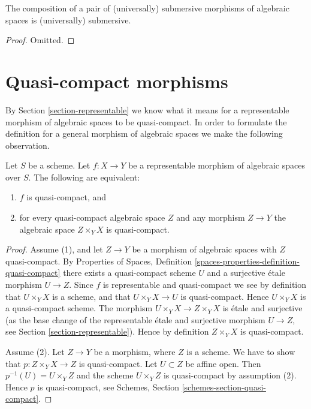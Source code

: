 \begin{lemma}
\label{lemma-composition-universally-submersive}
The composition of a pair of (universally) submersive morphisms of
algebraic spaces is (universally) submersive.
\end{lemma}

\begin{proof}
Omitted.
\end{proof}












\section{Quasi-compact morphisms}
\label{section-quasi-compact}

\noindent
By Section \ref{section-representable} we know what it means for
a representable morphism of algebraic spaces to be quasi-compact.
In order to formulate the definition for a general morphism
of algebraic spaces we make the following observation.

\begin{lemma}
\label{lemma-characterize-representable-quasi-compact}
Let $S$ be a scheme.
Let $f : X \to Y$ be a representable morphism of algebraic spaces over $S$.
The following are equivalent:
\begin{enumerate}
\item $f$ is quasi-compact, and
\item for every quasi-compact algebraic space $Z$ and any morphism
$Z \to Y$ the algebraic space $Z \times_Y X$ is quasi-compact.
\end{enumerate}
\end{lemma}

\begin{proof}
Assume (1), and let $Z \to Y$ be a morphism of algebraic spaces with
$Z$ quasi-compact. By
Properties of Spaces,
Definition \ref{spaces-properties-definition-quasi-compact}
there exists a quasi-compact scheme $U$ and a surjective \'etale
morphism $U \to Z$. Since $f$ is representable and quasi-compact
we see by definition that $U \times_Y X$ is a scheme, and that
$U \times_Y X \to U$ is quasi-compact. Hence $U \times_Y X$ is
a quasi-compact scheme. The morphism $U \times_Y X \to Z \times_Y X$
is \'etale and surjective (as the base change of the representable
\'etale and surjective morphism $U \to Z$, see
Section \ref{section-representable}).
Hence by definition $Z \times_Y X$ is quasi-compact.

\medskip\noindent
Assume (2). Let $Z \to Y$ be a morphism, where $Z$ is a scheme.
We have to show that $p : Z \times_Y X \to Z$ is quasi-compact.
Let $U \subset Z$ be affine open. Then $p^{-1}(U) = U \times_Y Z$
and the scheme $U \times_Y Z$ is quasi-compact by assumption (2).
Hence $p$ is quasi-compact, see
Schemes, Section \ref{schemes-section-quasi-compact}.
\end{proof}

